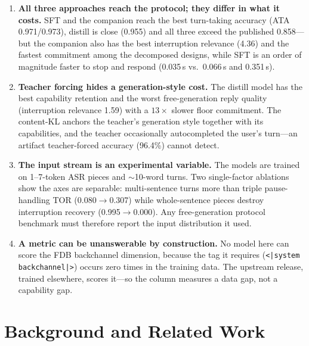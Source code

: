 \documentclass[conference]{IEEEtran}
\begin{document}
\begin{enumerate}
  \item \textbf{All three approaches reach the protocol; they differ in what it
        costs.} SFT and the companion reach the best turn-taking accuracy
        (ATA 0.971/0.973), distill is close (0.955) and all three exceed the
        published 0.858---but the companion also has the best interruption
        relevance (4.36) and the fastest commitment among the decomposed designs,
        while SFT is an order of magnitude faster to stop and respond (0.035\,s
        vs.\ 0.066\,s and 0.351\,s).
  \item \textbf{Teacher forcing hides a generation-style cost.} The distill model
        has the best capability retention and the worst free-generation reply
        quality (interruption relevance 1.59) with a $13\times$ slower floor
        commitment. The content-KL anchors the teacher's generation style
        together with its capabilities, and the teacher occasionally
        autocompleted the user's turn---an artifact teacher-forced accuracy
        (96.4\%) cannot detect.
  \item \textbf{The input stream is an experimental variable.} The models are
        trained on 1--7-token ASR pieces and $\sim$10-word turns. Two single-factor
        ablations show the axes are separable: multi-sentence turns more than
        triple pause-handling TOR (0.080$\rightarrow$0.307) while whole-sentence
        pieces destroy interruption recovery (0.995$\rightarrow$0.000). Any
        free-generation protocol benchmark must therefore report the input
        distribution it used.
  \item \textbf{A metric can be unanswerable by construction.} No model here can
        score the FDB backchannel dimension, because the tag it requires
        (\texttt{<|system backchannel|>}) occurs zero times in the training data.
        The upstream release, trained elsewhere, scores it---so the column
        measures a data gap, not a capability gap.
\end{enumerate}

\section{Background and Related Work}
\label{sec:background}
\end{document}
